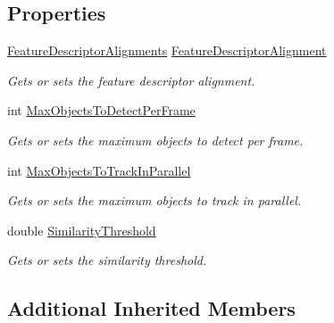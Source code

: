 \subsection*{Properties}
\begin{DoxyCompactItemize}
\item 
\hyperlink{class_a_rdev_kit_1_1_model_1_1_project_1_1_markerless_sensor_a1c0b341ee16aa03d68b67714f1cfca53}{Feature\-Descriptor\-Alignments} \hyperlink{class_a_rdev_kit_1_1_model_1_1_project_1_1_markerless_sensor_a16b0d056f8ce0a6e79bdb23df1222fd4}{Feature\-Descriptor\-Alignment}
\begin{DoxyCompactList}\small\item\em Gets or sets the feature descriptor alignment. \end{DoxyCompactList}\item 
int \hyperlink{class_a_rdev_kit_1_1_model_1_1_project_1_1_markerless_sensor_ae9ea2cf4d222d4ac0277562b25b6619a}{Max\-Objects\-To\-Detect\-Per\-Frame}
\begin{DoxyCompactList}\small\item\em Gets or sets the maximum objects to detect per frame. \end{DoxyCompactList}\item 
int \hyperlink{class_a_rdev_kit_1_1_model_1_1_project_1_1_markerless_sensor_ac88579a60d45b1d6df015f5e7fd39520}{Max\-Objects\-To\-Track\-In\-Parallel}
\begin{DoxyCompactList}\small\item\em Gets or sets the maximum objects to track in parallel. \end{DoxyCompactList}\item 
double \hyperlink{class_a_rdev_kit_1_1_model_1_1_project_1_1_markerless_sensor_ae4442307a3d64a66c605624a2341aaa2}{Similarity\-Threshold}
\begin{DoxyCompactList}\small\item\em Gets or sets the similarity threshold. \end{DoxyCompactList}\end{DoxyCompactItemize}
\subsection*{Additional Inherited Members}


